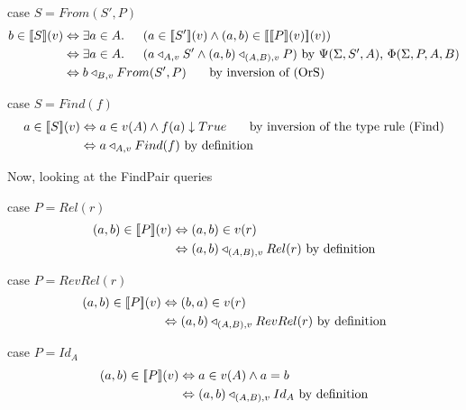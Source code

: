 \documentclass[twoside,a4paper,11pt]{article}
\newcommand{\db}[1]{{\bf [\![}#1{\bf ]\!]}}
\newcommand{\deno}[1]{\db{#1}(v)}
\newcommand{\denoRule}[2]{#1 \in \deno{#2}}
\newcommand{\opRule}[3]{#1 \triangleleft_{#2, v} #3}
\newcommand{\phiRule}[3]{\Phi(\Sigma, #1, #2, #3)}
\newcommand{\psiRule}[2]{\Psi(\Sigma, #1, #2)}
\begin{document}
case $S = From(S', P)$
\begin{equation} \label{case From}
\begin{split}
\denoRule{b}{S} & \Leftrightarrow \exists a \in A. \indent (\denoRule{a}{S'} \wedge \denoRule{(a, b)}{\deno{P}}) \\
				& \Leftrightarrow \exists a \in A. \indent (\opRule{a}{A}{S'} \wedge \opRule{(a, b)}{(A, B)}{P}) \mbox{ by $\psiRule{S'}{A}$, $\phiRule{P}{A}{B}$}\\
				& \Leftrightarrow \opRule{b}{B}{From(S', P)} \indent\mbox{ by inversion of (OrS)}
\end{split}
\end{equation}

case $S = Find(f)$
\begin{equation} \label{case Find}
\begin{split}
\denoRule{a}{S} & \Leftrightarrow a \in v(A) \wedge f(a) \downarrow True  \indent \mbox{ by inversion of the type rule (Find)}\\
				& \Leftrightarrow \opRule{a}{A}{Find(f)} \mbox{ by definition}\\
\end{split}
\end{equation}

Now, looking at the FindPair queries

case $P = Rel(r)$
\begin{equation} \label{case Rel}
\begin{split}
\denoRule{(a, b)}{P} & \Leftrightarrow (a, b) \in v(r)\\
				& \Leftrightarrow \opRule{(a, b)}{(A, B)}{Rel(r)} \mbox{ by definition}\\
\end{split}
\end{equation}

case $P = RevRel(r)$
\begin{equation} \label{case RevRel}
\begin{split}
\denoRule{(a, b)}{P} & \Leftrightarrow (b, a) \in v(r)\\
				& \Leftrightarrow \opRule{(a, b)}{(A, B)}{RevRel(r)} \mbox{ by definition}\\
\end{split}
\end{equation}

case $P = Id_A$
\begin{equation} \label{case Id_A}
\begin{split}
\denoRule{(a, b)}{P} & \Leftrightarrow a \in v(A) \wedge a = b\\
				& \Leftrightarrow \opRule{(a, b)}{(A, B)}{Id_A} \mbox{ by definition}\\
\end{split}
\end{equation}
\end{document}
